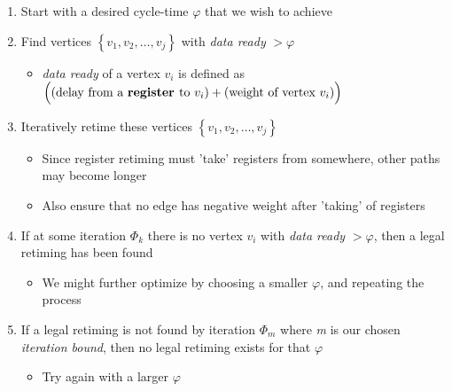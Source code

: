\documentclass{article}
\begin{document}
\begin{enumerate}
    \item Start with a desired cycle-time $\varphi$ that we wish to achieve
    \item Find vertices $\left\{ v_{1}, v_{2}, \dots, v_{j} \right\}$ with \textit{data ready} $> \varphi$
        \begin{itemize}
            \item \textit{data ready} of a vertex $v_{i}$ is defined as
                  $\Bigl( (\text{delay from a } \textbf{register } \text{to } v_{i}) + (\text{weight of vertex } v_{i}) \Bigr)$
        \end{itemize}
    \item Iteratively retime these vertices $\left\{ v_{1}, v_{2}, \dots, v_{j} \right\}$
        \begin{itemize}
            \item Since register retiming must 'take' registers from somewhere, other paths may become longer
            \item Also ensure that no edge has negative weight after 'taking' of registers
        \end{itemize}
    \item If at some iteration $\Phi_{k}$ there is no vertex $v_{i}$ with \textit{data ready} $> \varphi$, then a legal retiming has been found
        \begin{itemize}
            \item We might further optimize by choosing a smaller $\varphi$, and repeating the process
        \end{itemize}
    \item If a legal retiming is not found by iteration $\Phi_{m}$ where \textit{m} is our chosen \textit{iteration bound}, then no legal retiming exists for that $\varphi$
        \begin{itemize}
            \item Try again with a larger $\varphi$ 
        \end{itemize}
\end{enumerate}
\end{document}
